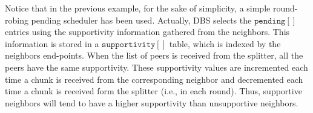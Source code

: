 Notice that in the previous example, for the sake of simplicity, a
simple round-robing pending scheduler has been used.  Actually, DBS
selects the $\mathtt{pending}[]$ entries using the supportivity
information gathered from the neighbors. This information is stored in
a $\mathtt{supportivity}[]$ table, which is indexed by the neighbors
end-points. When the list of peers is received from the splitter, all
the peers have the same supportivity. These supportivity values are
incremented each time a chunk is received from the corresponding
neighbor and decremented each time a chunk is received form the
splitter (i.e., in each round). Thus, supportive neighbors will tend
to have a higher supportivity than unsupportive neighbors.






\begin{comment}
In each round, peers check if a chunk have been received from the rest
of peers of the team (${\cal P}_k\in {\cal T}_j)$). If not, peers send
a $[\mathtt{propagate}~{\cal P}_i]$ to one or more (possibly
to the rest of) peers of the team, where ${\cal P}_i$ is the origin peer
of the missing chunk. At this point, the process continues as
described in Section~\ref{dbs:chunk_flooding}.
\end{comment}

